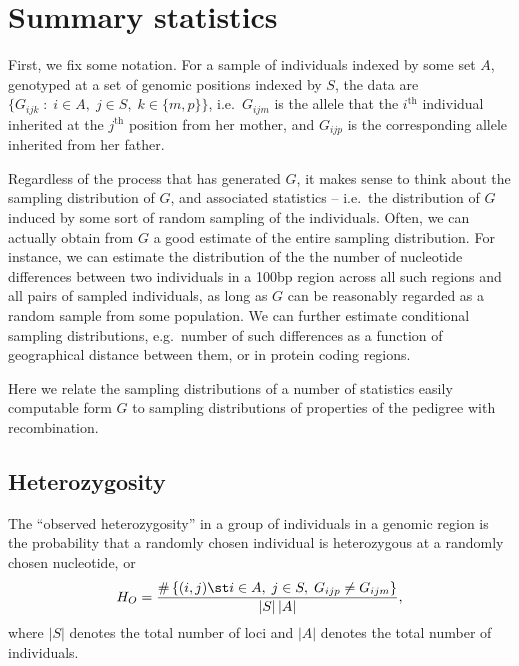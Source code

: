 \section{Summary statistics}

First, we fix some notation.
For a sample of individuals indexed by some set $A$,
genotyped at a set of genomic positions indexed by $S$,
the data are $\{G_{ijk} \; : \; i \in A, \; j \in S, \; k \in \{m,p\} \}$,
i.e.\ $G_{ijm}$ is the allele that the $i^\mathrm{th}$ individual inherited at the $j^\mathrm{th}$ position from her mother,
and $G_{ijp}$ is the corresponding allele inherited from her father.

Regardless of the process that has generated $G$, 
it makes sense to think about the sampling distribution of $G$,
and associated statistics --
i.e.\ the distribution of $G$ induced by some sort of random sampling of the individuals.
Often, we can actually obtain from $G$ a good estimate of the entire sampling distribution.
For instance, we can estimate the distribution of 
the the number of nucleotide differences between two individuals in a 100bp region
across all such regions and all pairs of sampled individuals,
as long as $G$ can be reasonably regarded as a random sample from some population.
We can further estimate conditional sampling distributions,
e.g.\ number of such differences as a function of geographical distance between them,
or in protein coding regions.

Here we relate the sampling distributions of a number of statistics easily computable form $G$
to sampling distributions of properties of the pedigree with recombination.


\subsection{Heterozygosity} 

The ``observed heterozygosity'' in a group of individuals in a genomic region 
is the probability that a randomly chosen individual is heterozygous at a randomly chosen nucleotide,
or 
\begin{align}
  H_O = \frac{ \# \left\{ (i,j) \st i \in A, \; j \in S, \; G_{ijp} \neq G_{ijm} \right\} }{ |S|\,|A| } ,
\end{align}
where $|S|$ denotes the total number of loci and $|A|$ denotes the total number of individuals.

